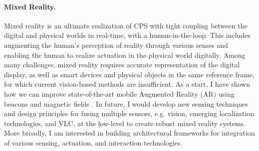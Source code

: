 \documentclass[10pt]{article}
\begin{document}

\paragraph{Mixed Reality. }
Mixed reality is an ultimate realization of CPS with tight coupling between the digital and physical worlds in real-time, with a human-in-the-loop. %
This includes augmenting the human's perception of reality through various senses and enabling the human to realize actuation in the physical world digitally. Among many challenges, 
mixed reality requires accurate representation of the digital display, as well as smart devices and physical objects in the same reference frame, for which current vision-based methods are insufficient.  As a start, I have shown how we can improve state-of-the-art mobile Augmented Reality (AR) using beacons and magnetic fields \cite{mobileAR}. In future, I would develop new sensing techniques and design principles for fusing multiple sensors, e.g. vision, emerging localization technologies, and VLC, at the low-level to create robust mixed reality systems. More broadly, I am interested in building architectural frameworks for integration of various sensing, actuation, and interaction technologies. \\
\end{document}
